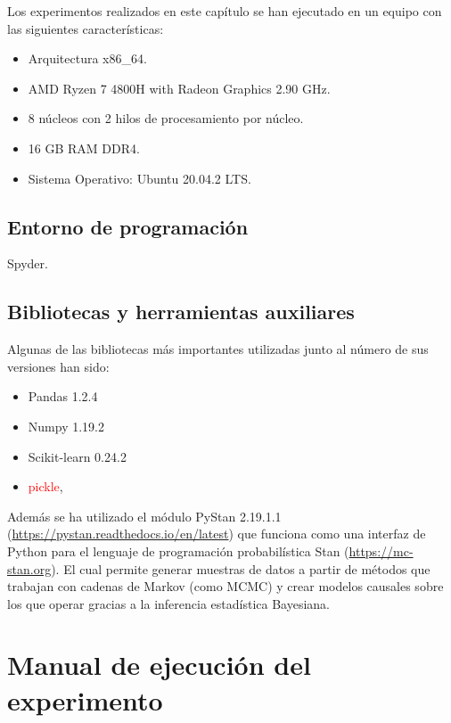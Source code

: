 \documentclass[oneside,openright,titlepage,numbers=noenddot,openany,headinclude,footinclude=true,
cleardoublepage=empty,abstractoff,BCOR=5mm,paper=a4,fontsize=12pt,main=spanish]{scrreprt}
\begin{document}
Los experimentos realizados en este capítulo se han ejecutado en un equipo con las siguientes características:

\begin{itemize}
    \item Arquitectura x86\_64.
    \item AMD Ryzen 7 4800H with Radeon Graphics 2.90 GHz.
    \item 8 núcleos con 2 hilos de procesamiento por núcleo.
    \item 16 GB RAM DDR4.
    \item Sistema Operativo: Ubuntu 20.04.2 LTS.
\end{itemize}

\subsection{Entorno de programación}

Spyder.

\subsection{Bibliotecas y herramientas auxiliares}

Algunas de las bibliotecas más importantes utilizadas junto al número de sus versiones han sido:

\begin{itemize}
    \item Pandas 1.2.4
    \item Numpy 1.19.2
    \item Scikit-learn 0.24.2
    \item \textcolor{red}{pickle}, %
\end{itemize}

Además se ha utilizado el módulo PyStan 2.19.1.1 (\url{https://pystan.readthedocs.io/en/latest}) que funciona como una interfaz de Python para el lenguaje de programación probabilística Stan (\url{https://mc-stan.org}). El cual permite generar muestras de datos a partir de métodos que trabajan con cadenas de Markov (como MCMC) y crear modelos causales sobre los que operar gracias a la inferencia estadística Bayesiana.

\section{Manual de ejecución del experimento}


\end{document}
